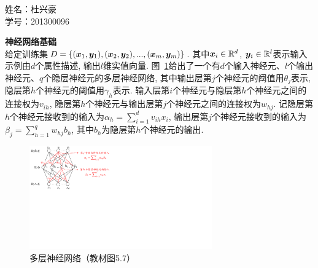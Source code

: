 \documentclass[answers]{exam}  %
\begin{document}
\Large
\noindent 
姓名：杜兴豪 \\
学号：201300096\\
\begin{questions}
\question [20] \textbf{神经网络基础} \\

给定训练集$D=\{({\boldsymbol{x}}_1, \boldsymbol{y}_1), ({\boldsymbol{x}}_2, \boldsymbol{y}_2), ..., ({\boldsymbol{x}}_m, \boldsymbol{y}_m)\}$. 其中${\boldsymbol{x}}_i \in \mathbb{R}^d$,
$\boldsymbol{y}_i \in \mathbb{R}^l$表示输入示例由$d$个属性描述,
输出$l$维实值向量.
图~\ref{ch5_img:mlp}给出了一个有$d$个输入神经元、$l$个输出神经元、$q$个隐层神经元的多层神经网络, 其中输出层第$j$个神经元的阈值用$\theta_j$表示, 隐层第$h$个神经元的阈值用$\gamma_h$表示. 输入层第$i$个神经元与隐层第$h$个神经元之间的连接权为$v_{ih}$,
隐层第$h$个神经元与输出层第$j$个神经元之间的连接权为$w_{hj}$.
记隐层第$h$个神经元接收到的输入为$\alpha_h=\sum_{i=1}^d v_{ih}x_i$,
输出层第$j$个神经元接收到的输入为$\beta_j=\sum_{h=1}^q w_{hj}b_h$,
其中$b_h$为隐层第$h$个神经元的输出.
\begin{figure}[ht]
    \centering
    \includegraphics[width=0.70\textwidth]{figure/ch5_nn.pdf}
    \caption{多层神经网络（教材图5.7）}\label{ch5_img:mlp}
\end{figure}


\end{questions}
\end{document}
